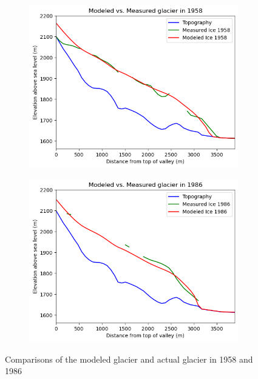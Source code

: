 \documentclass{article}
\begin{document}
\begin{figure}[h]
    \centering
    \begin{subfigure}[b]{0.49\textwidth}
        \centering
        \includegraphics[width=\textwidth]{Plots/1958_glacier_comparison.png}
        \label{fig:1958_glacier_comparison}
    \end{subfigure}
    \hfill
    \begin{subfigure}[b]{0.49\textwidth}
        \centering
        \includegraphics[width=\textwidth]{Plots/1986_glacier_comparison.png}
        \label{fig:1986_glacier_comparison}
    \end{subfigure}
    \caption{Comparisons of the modeled glacier and actual glacier in 1958 and 1986}
    \label{fig:glacier_comparison}
\end{figure}
\FloatBarrier
\end{document}
